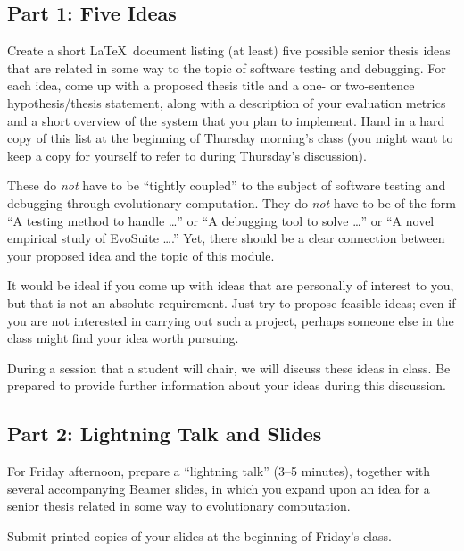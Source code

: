 
\usepackage[compact]{titlesec}




\subsection*{Part 1: Five Ideas}

Create a short \LaTeX\ document listing (at least) five possible senior thesis ideas that are related in some way to the
topic of software testing and debugging. For each idea, come up with a proposed thesis title and a one- or two-sentence
hypothesis/thesis statement, along with a description of your evaluation metrics and a short overview of the system
that you plan to implement. Hand in a hard copy of this list at the beginning of Thursday morning's class (you might
  want to keep a copy for yourself to refer to during Thursday's discussion).

These do {\em not} have to be ``tightly coupled'' to the subject of software testing and debugging through evolutionary
computation. They do {\em not} have to be of the form ``A testing method to handle \ldots'' or ``A debugging tool to
solve \ldots'' or ``A novel empirical study of EvoSuite \ldots.'' Yet, there should be a clear connection between
your proposed idea and the topic of this module.

It would be ideal if you come up with ideas that are personally of interest to you, but that is not an absolute
requirement. Just try to propose feasible ideas; even if you are not interested in carrying out such a project, perhaps
someone else in the class might find your idea worth pursuing.

During a session that a student will chair, we will discuss these ideas in class. Be prepared to provide further
information about your ideas during this discussion.

\subsection*{Part 2: Lightning Talk and Slides}
For Friday afternoon, prepare a ``lightning talk'' (3--5 minutes), together
with several accompanying Beamer slides, in which you expand upon an
idea for a senior thesis related in some way to 
evolutionary computation.

Submit printed copies of your slides at the beginning of Friday's class.

